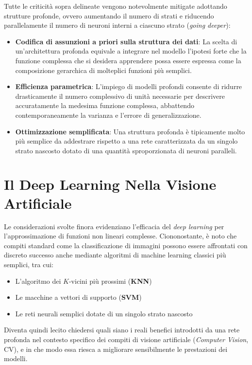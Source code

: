 ﻿\documentclass[11pt, a4paper]{article}
\begin{document}
Tutte le criticità sopra delineate vengono notevolmente mitigate adottando strutture profonde, ovvero aumentando il numero di strati e riducendo parallelamente il numero di neuroni interni a ciascuno strato (\emph{going deeper}):
\begin{itemize}[noitemsep]
    \item \textbf{Codifica di assunzioni a priori sulla struttura dei dati}: La scelta di un'architettura profonda equivale a integrare nel modello l'ipotesi forte che la funzione complessa che si desidera apprendere possa essere espressa come la composizione gerarchica di molteplici funzioni più semplici.
    \item \textbf{Efficienza parametrica}: L'impiego di modelli profondi consente di ridurre drasticamente il numero complessivo di unità necessarie per descrivere accuratamente la medesima funzione complessa, abbattendo contemporaneamente la varianza e l'errore di generalizzazione.
    \item \textbf{Ottimizzazione semplificata}: Una struttura profonda è tipicamente molto più semplice da addestrare rispetto a una rete caratterizzata da un singolo strato nascosto dotato di una quantità sproporzionata di neuroni paralleli.
\end{itemize}

\newpage

\section{Il Deep Learning Nella Visione Artificiale}

Le considerazioni svolte finora evidenziano l'efficacia del \emph{deep learning} per l'approssimazione di funzioni non lineari complesse. Ciononostante, è noto che compiti standard come la classificazione di immagini possono essere affrontati con discreto successo anche mediante algoritmi di machine learning classici più semplici, tra cui:
\begin{itemize}[noitemsep]
    \item L'algoritmo dei $K$-vicini più prossimi (\textbf{KNN})
    \item Le macchine a vettori di supporto (\textbf{SVM})
    \item Le reti neurali semplici dotate di un singolo strato nascosto
\end{itemize}

Diventa quindi lecito chiedersi quali siano i reali benefici introdotti da una rete profonda nel contesto specifico dei compiti di visione artificiale (\emph{Computer Vision}, CV), e in che modo essa riesca a migliorare sensibilmente le prestazioni dei modelli.
\end{document}
